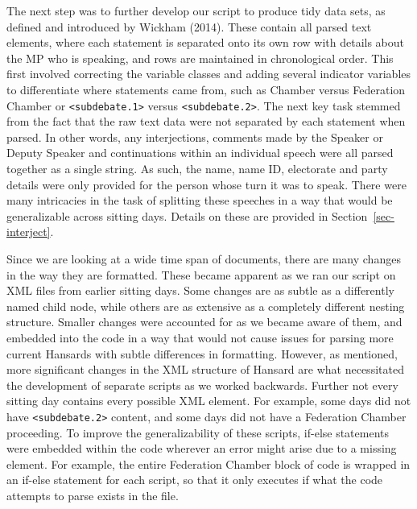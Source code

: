 \documentclass[
  letterpaper,
  DIV=11,
  numbers=noendperiod]{scrartcl}
\begin{document}
The next step was to further develop our script to produce tidy data
sets, as defined and introduced by Wickham (2014). These contain all
parsed text elements, where each statement is separated onto its own row
with details about the MP who is speaking, and rows are maintained in
chronological order. This first involved correcting the variable classes
and adding several indicator variables to differentiate where statements
came from, such as Chamber versus Federation Chamber or
\texttt{\textless{}subdebate.1\textgreater{}} versus
\texttt{\textless{}subdebate.2\textgreater{}}. The next key task stemmed
from the fact that the raw text data were not separated by each
statement when parsed. In other words, any interjections, comments made
by the Speaker or Deputy Speaker and continuations within an individual
speech were all parsed together as a single string. As such, the name,
name ID, electorate and party details were only provided for the person
whose turn it was to speak. There were many intricacies in the task of
splitting these speeches in a way that would be generalizable across
sitting days. Details on these are provided in
Section~\ref{sec-interject}.

Since we are looking at a wide time span of documents, there are many
changes in the way they are formatted. These became apparent as we ran
our script on XML files from earlier sitting days. Some changes are as
subtle as a differently named child node, while others are as extensive
as a completely different nesting structure. Smaller changes were
accounted for as we became aware of them, and embedded into the code in
a way that would not cause issues for parsing more current Hansards with
subtle differences in formatting. However, as mentioned, more
significant changes in the XML structure of Hansard are what
necessitated the development of separate scripts as we worked backwards.
Further not every sitting day contains every possible XML element. For
example, some days did not have
\texttt{\textless{}subdebate.2\textgreater{}} content, and some days did
not have a Federation Chamber proceeding. To improve the
generalizability of these scripts, if-else statements were embedded
within the code wherever an error might arise due to a missing element.
For example, the entire Federation Chamber block of code is wrapped in
an if-else statement for each script, so that it only executes if what
the code attempts to parse exists in the file.
\end{document}
